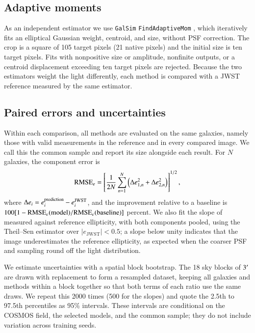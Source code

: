 \documentclass[longauth]{aa}
\begin{document}
\subsection{Adaptive moments}
\label{sc:adaptive_moments}

As an independent estimator we use \texttt{GalSim}
\texttt{FindAdaptiveMom} \citep{galsim}, which iteratively fits an elliptical Gaussian weight, centroid, and size, without PSF correction.
The crop is a square of 105 target pixels (21 native pixels) and the initial size is ten target pixels. 
Fits with nonpositive size or amplitude, nonfinite outputs, or a centroid displacement exceeding ten target pixels are rejected.
Because the two estimators weight the light differently, each method is compared with a JWST reference measured by the same estimator.

\subsection{Paired errors and uncertainties}
\label{sc:paired}

Within each comparison, all methods are evaluated on the same galaxies, namely those with valid measurements in the reference and in every compared image.
We call this the common sample and report its size alongside each result.
For $N$ galaxies, the component error is
\begin{equation}
    {\rm RMSE}_e=\left[\frac{1}{2N}\sum_{n=1}^{N}
    \left(\Delta e_{1,n}^2+\Delta e_{2,n}^2\right)\right]^{1/2},
\end{equation}
where $\Delta e_i=e_i^{\rm prediction}-e_i^{\rm JWST}$, and the improvement relative to a baseline is $100[1-{\rm RMSE}_e({\rm model})/{\rm RMSE}_e({\rm baseline})]$ percent.
We also fit the slope of measured against reference ellipticity, with both components pooled, using the Theil--Sen estimator over $|e_{\mathrm{JWST}}|<0.5$; a slope below unity indicates that the image underestimates the reference ellipticity, as expected when the coarser PSF and sampling round off the light distribution.

We estimate uncertainties with a spatial block bootstrap.
The 18 sky blocks of $3^\prime$ are drawn with replacement to form a resampled dataset, keeping all galaxies and methods within a block together so that both terms of each ratio use the same draws.
We repeat this 2000 times (500 for the slopes) and quote the 2.5th to 97.5th percentiles as 95\% intervals.
These intervals are conditional on the COSMOS field, the selected models, and the common sample; they do not include variation across training seeds.
\end{document}
